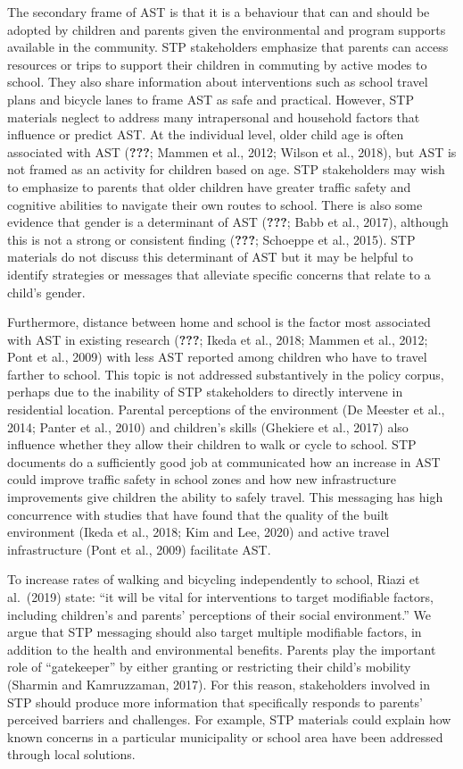 \documentclass[]{elsarticle} %
\begin{document}
The secondary frame of AST is that it is a behaviour that can and should
be adopted by children and parents given the environmental and program
supports available in the community. STP stakeholders emphasize that
parents can access resources or trips to support their children in
commuting by active modes to school. They also share information about
interventions such as school travel plans and bicycle lanes to frame AST
as safe and practical. However, STP materials neglect to address many
intrapersonal and household factors that influence or predict AST. At
the individual level, older child age is often associated with AST
({\textbf{???}}; Mammen et al., 2012; Wilson et al., 2018), but AST is
not framed as an activity for children based on age. STP stakeholders
may wish to emphasize to parents that older children have greater
traffic safety and cognitive abilities to navigate their own routes to
school. There is also some evidence that gender is a determinant of AST
({\textbf{???}}; Babb et al., 2017), although this is not a strong or
consistent finding ({\textbf{???}}; Schoeppe et al., 2015). STP
materials do not discuss this determinant of AST but it may be helpful
to identify strategies or messages that alleviate specific concerns that
relate to a child's gender.

Furthermore, distance between home and school is the factor most
associated with AST in existing research ({\textbf{???}}; Ikeda et al.,
2018; Mammen et al., 2012; Pont et al., 2009) with less AST reported
among children who have to travel farther to school. This topic is not
addressed substantively in the policy corpus, perhaps due to the
inability of STP stakeholders to directly intervene in residential
location. Parental perceptions of the environment (De Meester et al.,
2014; Panter et al., 2010) and children's skills (Ghekiere et al., 2017)
also influence whether they allow their children to walk or cycle to
school. STP documents do a sufficiently good job at communicated how an
increase in AST could improve traffic safety in school zones and how new
infrastructure improvements give children the ability to safely travel.
This messaging has high concurrence with studies that have found that
the quality of the built environment (Ikeda et al., 2018; Kim and Lee,
2020) and active travel infrastructure (Pont et al., 2009) facilitate
AST.

To increase rates of walking and bicycling independently to school,
Riazi et al.~(2019) state: ``it will be vital for interventions to
target modifiable factors, including children's and parents' perceptions
of their social environment.'' We argue that STP messaging should also
target multiple modifiable factors, in addition to the health and
environmental benefits. Parents play the important role of
``gatekeeper'' by either granting or restricting their child's mobility
(Sharmin and Kamruzzaman, 2017). For this reason, stakeholders involved
in STP should produce more information that specifically responds to
parents' perceived barriers and challenges. For example, STP materials
could explain how known concerns in a particular municipality or school
area have been addressed through local solutions.
\end{document}
